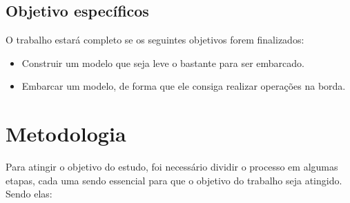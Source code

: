 \subsection{Objetivo específicos}
O trabalho estará completo se os seguintes objetivos forem finalizados:

\begin{itemize}
	\item Construir um modelo que seja leve o bastante para ser embarcado.
	\item Embarcar um modelo, de forma que ele consiga realizar operações na borda.
\end{itemize}

\section{Metodologia}
Para atingir o objetivo do estudo, foi necessário dividir o processo em algumas etapas, cada uma sendo
essencial para que o objetivo do trabalho seja atingido. Sendo elas:

